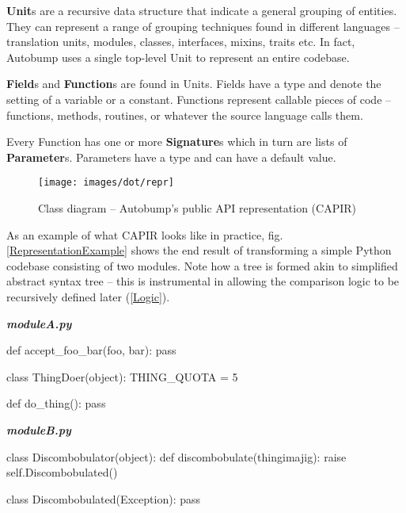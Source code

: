 \documentclass{l4proj}
\begin{document}
\textbf{Unit}s are a recursive data structure that indicate a
general grouping of entities. They can represent a range of grouping
techniques found in different languages -- translation units, modules,
classes, interfaces, mixins, traits etc. In fact, Autobump uses a
single top-level Unit to represent an entire codebase.

\textbf{Field}s and \textbf{Function}s are found in Units. Fields have
a type and denote the setting of a variable or a constant. Functions
represent callable pieces of code -- functions, methods, routines, or
whatever the source language calls them.

Every Function has one or more \textbf{Signature}s which in turn are
lists of \textbf{Parameter}s. Parameters have a type and can have a
default value.

\begin{figure}
\centering
\texttt{[image: images/dot/repr]}
\caption{Class diagram -- Autobump's public API representation (CAPIR)}
\label{RepresentationUML}
\end{figure}


\clearpage
As an example of what CAPIR looks like in practice, fig.
\ref{RepresentationExample} shows the end result of transforming a
simple Python codebase consisting of two modules. Note how a tree is
formed akin to simplified abstract syntax tree -- this is instrumental
in allowing the comparison logic to be recursively defined later
(\ref{Logic}).

\begin{minipage}[t]{0.5\textwidth}
\noindent\textbf{\textit{moduleA.py}}\\
\begin{python}
def accept_foo_bar(foo, bar):
    pass

class ThingDoer(object):
    THING_QUOTA = 5

    def do_thing():
        pass
\end{python}
\end{minipage}
\begin{minipage}[t]{0.5\textwidth}
\noindent\textbf{\textit{moduleB.py}}\\
\begin{python}
class Discombobulator(object):
    def discombobulate(thingimajig):
        raise self.Discombobulated()

    class Discombobulated(Exception):
        pass
\end{python}
\end{minipage}
\end{document}
